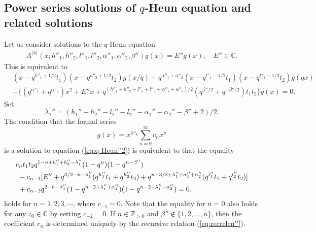\documentclass[12pt]{amsart}
\numberwithin{equation}{section}
\theoremstyle{definition}
\theoremstyle{remark}
\begin{document}
\subsection{Power series solutions of $q$-Heun equation and related solutions} \label{sec:pow}

Let us consider solutions to the $q$-Heun equation
  \begin{align}
    A^{\langle 4 \rangle} (x; h''_{1}, h''_{2}, l''_{1}, l''_{2}, \alpha ''_{1}, \alpha ''_{2}, \beta '') g(x) = E'' g(x), \quad \text{$E'' \in \mathbb{C}$}. \label{eq:q-Heun''}
  \end{align}
This is equivalent to 
\begin{align}
& (x-q^{h''_1 + 1/2} t_1) (x-q^{h''_2 +1/2} t_2) g(x/q) +  q^{\alpha ''_1 +\alpha ''_2} (x - q^{l''_1 -1/2} t_1) (x - q^{l''_2 -1/2} t_2) g(qx)  \label{eq:q-Heun''2} \\
& -\{ (q^{\alpha ''_1} +q^{\alpha ''_2} ) x^2 + E'' x  + q^{(h''_1 +h''_2 + l''_1 +l''_2 +\alpha ''_1 +\alpha ''_2 )/2} ( q^{\beta ''/2} + q^{-\beta ''/2} ) t_1 t_2  \} g(x) = 0 . \nonumber 
\end{align}
Set 
\begin{equation}
\lambda_{1}'' = (h_{1}'' + h_{2}'' - l_{1}'' - l_{2}'' - \alpha_{1}'' - \alpha_{2}'' - \beta'' + 2)/2. \label{eq:lamabda''}
\end{equation}
The condition that the formal series 
\begin{equation*}
g(x) =  x^{\lambda ''_{1}} \sum_{n =0}^{\infty } c_{n} x^{n} 
\end{equation*}
 is a solution to equation (\ref{eq:q-Heun''2}) is equivalent to that the equality
\begin{align}
 & c_{n} t_{1}t_{2}q^{  1- n + h''_{1} + h''_{2} - \lambda ''_{1}} (1 - q^{n})(1 - q^{n - \beta '' }) \label{eq:recrelcn''} \\
 & \ - c_{n - 1} [E'' + q^{3/2- n - \lambda ''_{1} } (q^{h''_{1}}t_{1} + q^{h''_{2}}t_{2} ) + q^{n - 3/2 + \lambda ''_{1} + \alpha ''_{1} + \alpha ''_{2} }( q^{l''_{1}}t_{1} + q^{l''_{2}}t_{2} ) ] \notag \\
 & \ + c_{n - 2} q^{ 2- n - \lambda ''_{1} } (1 - q^{n - 2 + \lambda ''_{1} + \alpha ''_{1} })(1 - q^{n - 2 + \lambda ''_{1} + \alpha ''_{2} }) = 0 . \notag
  \end{align}
holds for $n = 1 ,2,3, \cdots $, where $c_{-1} =0$.
Note that the equality for $n=0$ also holds for any $c_0 \in \mathbb{C}$ by setting $c_{-2} =0$.
If $n \in \mathbb{Z} _{>0}$ and $\beta '' \not \in \{ 1,2, \dots ,n \}$, then the coefficient $c_n$ is determined uniquely by the recursive relation (\ref{eq:recrelcn''}).
\end{document}
